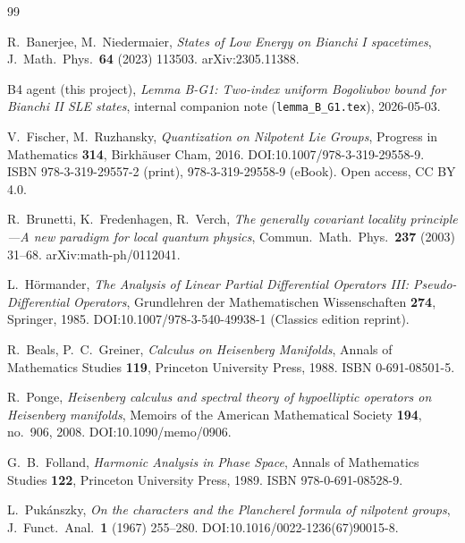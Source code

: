 \documentclass[11pt, a4paper]{article}
\begin{document}
\begin{thebibliography}{99}

R.~Banerjee, M.~Niedermaier,
\textit{States of Low Energy on Bianchi I spacetimes},
J.\ Math.\ Phys.\ \textbf{64} (2023) 113503.
arXiv:2305.11388.

B4 agent (this project),
\textit{Lemma B-G1: Two-index uniform Bogoliubov bound for Bianchi II SLE
states}, internal companion note (\texttt{lemma\_B\_G1.tex}), 2026-05-03.

V.~Fischer, M.~Ruzhansky,
\textit{Quantization on Nilpotent Lie Groups},
Progress in Mathematics \textbf{314}, Birkhäuser Cham, 2016.
DOI:10.1007/978-3-319-29558-9.
ISBN 978-3-319-29557-2 (print), 978-3-319-29558-9 (eBook).
Open access, CC BY 4.0.

R.~Brunetti, K.~Fredenhagen, R.~Verch,
\textit{The generally covariant locality principle---A new paradigm for
local quantum physics},
Commun.\ Math.\ Phys.\ \textbf{237} (2003) 31--68.
arXiv:math-ph/0112041.

L.~Hörmander,
\textit{The Analysis of Linear Partial Differential Operators III:
Pseudo-Differential Operators},
Grundlehren der Mathematischen Wissenschaften \textbf{274}, Springer, 1985.
DOI:10.1007/978-3-540-49938-1 (Classics edition reprint).

R.~Beals, P.~C.~Greiner,
\textit{Calculus on Heisenberg Manifolds},
Annals of Mathematics Studies \textbf{119}, Princeton University Press, 1988.
ISBN 0-691-08501-5.

R.~Ponge,
\textit{Heisenberg calculus and spectral theory of hypoelliptic operators
on Heisenberg manifolds},
Memoirs of the American Mathematical Society \textbf{194}, no.~906, 2008.
DOI:10.1090/memo/0906.

G.~B.~Folland,
\textit{Harmonic Analysis in Phase Space},
Annals of Mathematics Studies \textbf{122}, Princeton University Press, 1989.
ISBN 978-0-691-08528-9.

L.~Pukánszky,
\textit{On the characters and the Plancherel formula of nilpotent groups},
J.\ Funct.\ Anal.\ \textbf{1} (1967) 255--280.
DOI:10.1016/0022-1236(67)90015-8.


\end{thebibliography}
\end{document}

